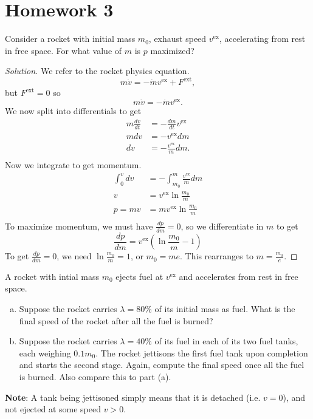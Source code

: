 \documentclass{article}
\begin{document}
\section{Homework 3}

\begin{prb}
\label{prb1}
Consider a rocket with initial mass $m_0$, exhaust speed
$v^{\textrm{ex}}$, accelerating from rest in free space. For what value
of $m$ is $p$ maximized?
\end{prb}

\begin{proof}[Solution]
We refer to the rocket physics equation.
\[ m\dot{v} = -\dot{m}v^{\textrm{ex}} + F^{\textrm{ext}}, \]
but $F^{\textrm{ext}} = 0$ so
\[ m\dot{v} = -\dot{m}v^{\textrm{ex}}. \]
We now split into differentials to get
\[ \begin{aligned}
m \frac{dv}{dt} &= -\frac{dm}{dt}v^{\textrm{ex}} \\
m dv            &= -v^{\textrm{ex}} dm \\
dv              &= -\frac{v^{\textrm{ex}}}{m} dm. \\
\end{aligned} \]
Now we integrate to get momentum.
\[ \begin{aligned}
\int_0^v dv &= -\int_{m_0}^m \frac{v^{\textrm{ex}}}{m} dm \\
v &= v^{\textrm{ex}} \ln \frac{m_0}{m} \\
p = mv &= mv^{\textrm{ex}} \ln \frac{m_0}{m} \\
\end{aligned} \]
To maximize momentum, we must have $\frac{dp}{dm} = 0$, so we
differentiate in $m$ to get
\[ \frac{dp}{dm} = v^{\textrm{ex}}\left(\ln \frac{m_0}{m} - 1\right) \]
To get $\frac{dp}{dm} = 0$, we need $\ln \frac{m_0}{m} = 1$, or $m_0 =
me$. This rearranges to $\boxed{m = \frac{m_0}{e}}$.
\end{proof}

\begin{prb}
A rocket with intial mass $m_0$ ejects fuel at $v^{\textrm{ex}}$ and
accelerates from rest in free space.
\begin{enumerate}[(a)]
\item
Suppose the rocket carries $\lambda = 80\%$ of its initial mass as fuel.
What is the final speed of the rocket after all the fuel is burned?
\item
Suppose the rocket carries $\lambda = 40\%$ of its fuel in each of its
two fuel tanks, each weighing $0.1 m_0$. The rocket jettisons the first
fuel tank upon completion and starts the second stage. Again, compute
the final speed once all the fuel is burned. Also compare this to part
(a).
\end{enumerate}
\textbf{Note}: A tank being jettisoned simply means that it is detached
(i.e. $v = 0$), and not ejected at some speed $v > 0$.
\end{prb}
\end{document}
